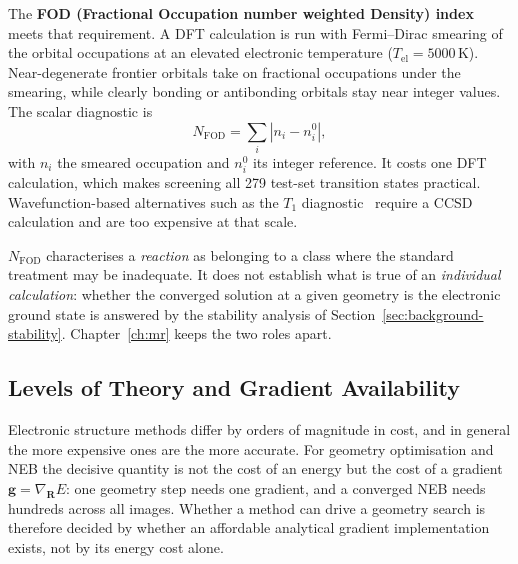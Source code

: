 The \textbf{FOD (Fractional Occupation number weighted Density)
index}~\cite{grimme2015} meets that requirement. A DFT calculation is run with
Fermi--Dirac smearing of the orbital occupations at an elevated electronic
temperature ($T_\text{el} = 5000$\,K). Near-degenerate frontier orbitals take on
fractional occupations under the smearing, while clearly bonding or antibonding
orbitals stay near integer values. The scalar diagnostic is
%
\begin{equation}
  N_\text{FOD} = \sum_i |n_i - n_i^0| ,
\end{equation}
%
with $n_i$ the smeared occupation and $n_i^0$ its integer reference. It costs one
DFT calculation, which makes screening all 279 test-set transition states
practical. Wavefunction-based alternatives such as the $T_1$
diagnostic~\cite{lee1989} require a CCSD calculation and are too expensive at that
scale.

$N_\text{FOD}$ characterises a \emph{reaction} as belonging to a class where the
standard treatment may be inadequate. It does not establish what is true of an
\emph{individual calculation}: whether the converged solution at a given geometry
is the electronic ground state is answered by the stability analysis of
Section~\ref{sec:background-stability}. Chapter~\ref{ch:mr} keeps the two roles
apart.

\subsection{Levels of Theory and Gradient Availability}
\label{sec:background-ladder}

Electronic structure methods differ by orders of magnitude in cost, and in general
the more expensive ones are the more accurate. For geometry optimisation and NEB
the decisive quantity is not the cost of an energy but the cost of a gradient
$\mathbf{g} = \nabla_\mathbf{R} E$: one geometry step needs one gradient, and a
converged NEB needs hundreds across all images. Whether a method can drive a
geometry search is therefore decided by whether an affordable analytical gradient
implementation exists, not by its energy cost alone.

